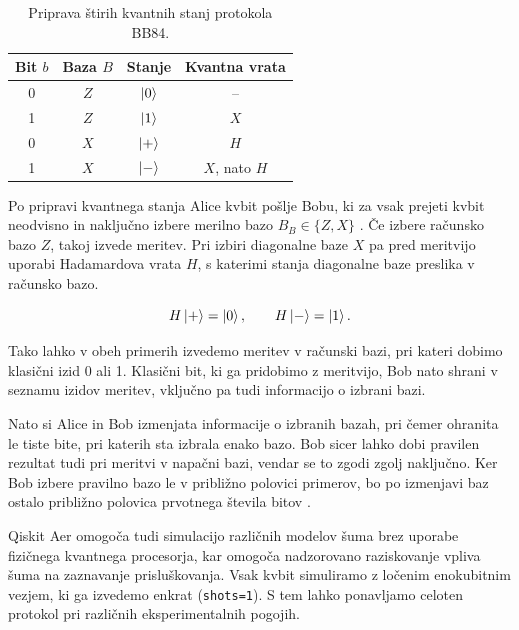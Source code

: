     \begin{table}[htbp]
        \centering
        \caption{Priprava štirih kvantnih stanj protokola BB84.}
        \label{g22:tab:priprava_stanj}
        \begin{tabular}{cccc}
            \toprule
            Bit $b$ & Baza $B$ & Stanje & Kvantna vrata \\
            \midrule
            0 & $Z$ & $\ket{0}$ & -- \\
            1 & $Z$ & $\ket{1}$ & $X$ \\
            0 & $X$ & $\ket{+}$ & $H$ \\
            1 & $X$ & $\ket{-}$ & $X$, nato $H$ \\
            \bottomrule
        \end{tabular}
    \end{table}

    Po pripravi kvantnega stanja Alice kvbit pošlje Bobu, ki za vsak prejeti kvbit neodvisno in naključno izbere merilno bazo $B_B \in \{Z,X\}$ \cite{g22:mina2020scalable}.
    Če izbere računsko bazo $Z$, takoj izvede meritev. Pri izbiri diagonalne baze $X$ pa pred meritvijo uporabi Hadamardova vrata $H$, s katerimi stanja diagonalne baze preslika v računsko bazo.


    \begin{equation}
        H\ket{+} = \ket{0}, \qquad H\ket{-} = \ket{1}.
        \label{g22:eq:hadamard_meritev}
    \end{equation}

    Tako lahko v obeh primerih izvedemo meritev v računski bazi, pri kateri dobimo klasični izid 0 ali 1. Klasični bit, ki ga pridobimo z meritvijo, Bob nato shrani v seznamu izidov meritev, vključno pa tudi informacijo o izbrani bazi.

    Nato si Alice in Bob izmenjata informacije o izbranih bazah, pri čemer ohranita le tiste bite, pri katerih sta izbrala enako bazo. Bob sicer lahko dobi pravilen rezultat tudi pri meritvi v napačni bazi, vendar se to zgodi zgolj naključno. 
    Ker Bob izbere pravilno bazo le v približno polovici primerov, bo po izmenjavi baz ostalo približno polovica prvotnega števila bitov \cite{g22:mina2020scalable}.


    Qiskit Aer omogoča tudi simulacijo različnih modelov šuma brez uporabe fizičnega kvantnega procesorja, kar omogoča nadzorovano raziskovanje vpliva šuma na zaznavanje prisluškovanja.
    Vsak kvbit simuliramo z ločenim enokubitnim vezjem, ki ga izvedemo enkrat (\texttt{shots=1}). S tem lahko ponavljamo celoten protokol pri različnih eksperimentalnih pogojih.

